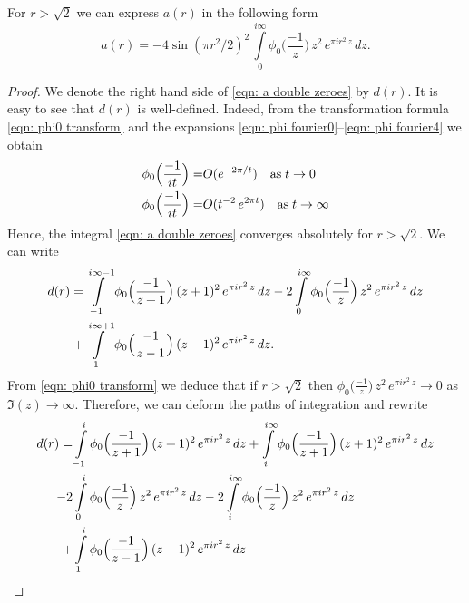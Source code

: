\begin{proposition}\label{prop: a(r) double zeroes}
For $r>\sqrt{2}$ we can express $a(r)$ in the following form
\begin{equation}\label{eqn: a double zeroes}
  a(r)=-4\sin(\pi r^2/2)^2\,\int\limits_{0}^{i\infty}\phi_0\Big(\frac{-1}{z}\Big)\,z^2\,e^{\pi i r^2 \,z}\,dz.
\end{equation}
\end{proposition}
\begin{proof}
We denote the right hand side of \eqref{eqn: a double zeroes} by $d(r)$.  It is easy to see that $d(r)$ is well-defined. Indeed, from the transformation formula \eqref{eqn: phi0 transform} and the expansions \eqref{eqn: phi fourier0}--\eqref{eqn: phi fourier4} we obtain
\begin{align}
\phi_0\Big(\frac{-1}{it}\Big)=&O(e^{-2\pi/t})\quad\mbox{as}\;t\to 0\notag\\
\phi_0\Big(\frac{-1}{it}\Big)=&O(t^{-2}\,e^{2\pi t})\quad\mbox{as}\;t\to \infty\notag
\end{align}
Hence, the integral \eqref{eqn: a double zeroes} converges absolutely for $r>\sqrt{2}$.
  We can write %
\begin{align}
  d(r)=&\int\limits_{-1}^{i\infty-1}\phi_0\Big(\frac{-1}{z+1}\Big)\,(z+1)^2\,e^{\pi i r^2 \,z}\,dz-
  2\int\limits_{0}^{i\infty}\phi_0\Big(\frac{-1}{z}\Big)\,z^2\,e^{\pi i r^2 \,z}\,dz\notag\\
  +&\int\limits_{1}^{i\infty+1}\phi_0\Big(\frac{-1}{z-1}\Big)\,(z-1)^2\,e^{\pi i r^2 \,z}\,dz.\notag
\end{align}
From \eqref{eqn: phi0 transform} we deduce that if $r>\sqrt{2}$ then
$\phi_0\Big(\frac{-1}{z}\Big)\,z^2\,e^{\pi i r^2 \,z}\to 0$ as $\Im(z)\to\infty$. Therefore, we can deform the paths of integration
and rewrite
\begin{align}
  d(r)=&\int\limits_{-1}^{i}\phi_0\Big(\frac{-1}{z+1}\Big)\,(z+1)^2\,e^{\pi i r^2 \,z}\,dz
  +\int\limits_{i}^{i\infty}\phi_0\Big(\frac{-1}{z+1}\Big)\,(z+1)^2\,e^{\pi i r^2 \,z}\,dz\notag\\
  -2&\int\limits_{0}^{i}\phi_0\Big(\frac{-1}{z}\Big)\,z^2\,e^{\pi i r^2 \,z}\,dz
  -2\int\limits_{i}^{i\infty}\phi_0\Big(\frac{-1}{z}\Big)\,z^2\,e^{\pi i r^2 \,z}\,dz\notag\\
  +&\int\limits_{1}^{i}\phi_0\Big(\frac{-1}{z-1}\Big)\,(z-1)^2\,e^{\pi i r^2 \,z}\,dz

\end{align}
\end{proof}
